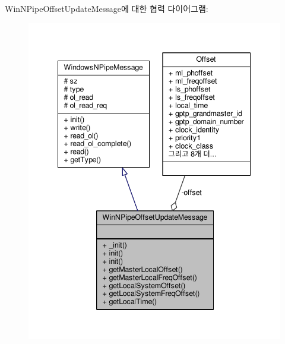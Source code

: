 Win\+N\+Pipe\+Offset\+Update\+Message에 대한 협력 다이어그램\+:
\nopagebreak
\begin{figure}[H]
\begin{center}
\leavevmode
\includegraphics[width=342pt]{class_win_n_pipe_offset_update_message__coll__graph}
\end{center}
\end{figure}
